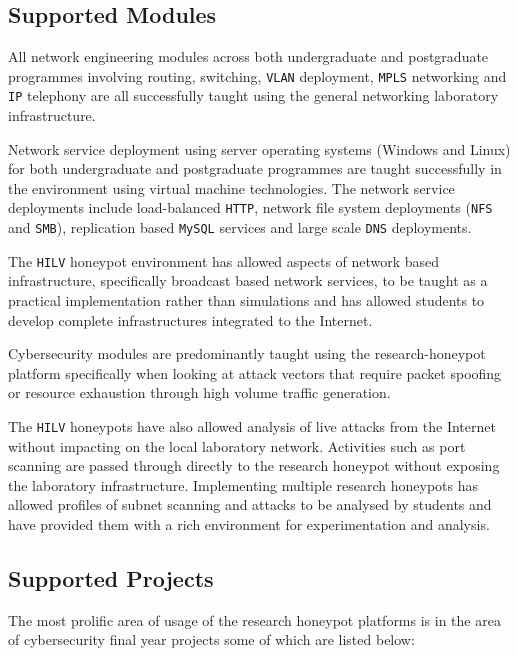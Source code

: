 \documentclass{llncs}
\begin{document}
\subsection{Supported Modules\label{Modules}}

All network engineering modules across both undergraduate and postgraduate
programmes involving routing, switching, \texttt{VLAN} deployment,
\texttt{MPLS} networking and \texttt{IP} telephony are all successfully taught
using the general networking laboratory infrastructure.

Network service deployment using server operating systems (Windows and Linux)
for both undergraduate and postgraduate programmes are taught successfully in
the environment using virtual machine technologies. The network service
deployments include load-balanced \texttt{HTTP}, network file system
deployments (\texttt{NFS} and \texttt{SMB}), replication based \texttt{MySQL}
services and large scale \texttt{DNS} deployments.

The \texttt{HILV} honeypot environment has allowed aspects of network based
infrastructure, specifically broadcast based network services, to be taught as
a practical implementation rather than simulations and has allowed students to
develop complete infrastructures integrated to the Internet.

Cybersecurity modules are predominantly taught using the research-honeypot
platform specifically when looking at attack vectors that require packet
spoofing or resource exhaustion through high volume traffic generation.

The \texttt{HILV} honeypots have also allowed analysis of live attacks from the
Internet without impacting on the local laboratory network. Activities such as
port scanning are passed through directly to the research honeypot without
exposing the laboratory infrastructure. Implementing multiple research
honeypots has allowed profiles of subnet scanning and attacks to be analysed by
students and have provided them with a rich environment for experimentation and
analysis.

\subsection{Supported Projects\label{Projects}}

The most prolific area of usage of the research honeypot platforms is in the
area of cybersecurity final year projects some of which are listed below:
\end{document}
